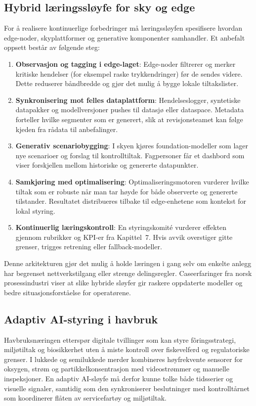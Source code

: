 \subsection{Hybrid læringssløyfe for sky og edge}
For å realisere kontinuerlige forbedringer må læringssløyfen spesifisere hvordan edge-noder, skyplattformer og generative komponenter samhandler. Et anbefalt oppsett består av følgende steg:
\begin{enumerate}
    \item \textbf{Observasjon og tagging i edge-laget}: Edge-noder filtrerer og merker kritiske hendelser (for eksempel raske trykkendringer) før de sendes videre. Dette reduserer båndbredde og gjør det mulig å bygge lokale tiltakslister.
    \item \textbf{Synkronisering mot felles dataplattform}: Hendelseslogger, syntetiske datapakker og modellversjoner pushes til datasjø eller dataspace. Metadata forteller hvilke segmenter som er generert, slik at revisjonsteamet kan følge kjeden fra rådata til anbefalinger.
    \item \textbf{Generativ scenariobygging}: I skyen kjøres foundation-modeller som lager nye scenarioer og forslag til kontrolltiltak. Fagpersoner får et dashbord som viser forskjellen mellom historiske og genererte datapunkter.
    \item \textbf{Samkjøring med optimalisering}: Optimaliseringsmotoren vurderer hvilke tiltak som er robuste når man tar høyde for både observerte og genererte tilstander. Resultatet distribueres tilbake til edge-enhetene som kontekst for lokal styring.
    \item \textbf{Kontinuerlig læringskontroll}: En styringskomité vurderer effekten gjennom rubrikker og KPI-er fra Kapittel~7. Hvis avvik overstiger gitte grenser, trigges retrening eller fallback-modeller.
\end{enumerate}
Denne arkitekturen gjør det mulig å holde læringen i gang selv om enkelte anlegg har begrenset nettverkstilgang eller strenge delingsregler. Caseerfaringer fra norsk prosessindustri viser at slike hybride sløyfer gir raskere oppdaterte modeller og bedre situasjonsforståelse for operatørene.\citep{kongsberg2023kognitwin}

\subsection{Adaptiv AI-styring i havbruk}
Havbruksnæringen etterspør digitale tvillinger som kan styre fôringsstrategi, miljøtiltak og biosikkerhet uten å miste kontroll over fiskevelferd og regulatoriske grenser.\citep{fore2018precision,nfd2023sjomatmelding} I lukkede og semilukkede merder kombineres høyfrekvente sensorer for oksygen, strøm og partikkelkonsentrasjon med videostrømmer og manuelle inspeksjoner. En adaptiv AI-sløyfe må derfor kunne tolke både tidsserier og visuelle signaler, samtidig som den synkroniserer beslutninger med kontrolltårnet som koordinerer flåten av servicefartøy og miljøtiltak.

